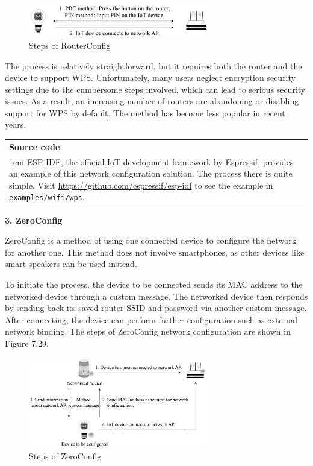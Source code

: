 \documentclass[a4paper,12pt,openany]{book}
\newcommand{\note}[2][NOTE]{ %
\vspace{6pt}
\begin{tabular}{b{\textwidth}}
\hline
\fontfamily{phv}\selectfont \textbf{#1}\\
\leftskip 1em #2\\
\hline
\end{tabular}
}
\begin{document}
\begin{figure}[!h]
    \centering
    \includegraphics[width=0.7\textwidth]{D7Z/7-28}
    \caption{Steps of RouterConfig}
\end{figure}

The process is relatively straightforward, but it requires both the router and the device to support WPS. Unfortunately, many users neglect encryption security settings due to the cumbersome steps involved, which can lead to serious security issues. As a result, an increasing number of routers are abandoning or disabling support for WPS by default. The method has become less popular in recent years.

\note[Source code]{ESP-IDF, the official IoT development framework by Espressif, provides an example of this network configuration solution. The process there is quite simple. Visit \url{https://github.com/espressif/esp-idf} to see the example in \href{https://github.com/espressif/esp-idf/tree/master/examples/wifi/wps}{\texttt{examples/wifi/wps}}.}

\textbf{3. ZeroConfig}

ZeroConfig is a method of using one connected device to configure the network for another one. This method does not involve smartphones, as other devices like smart speakers can be used instead.

To initiate the process, the device to be connected sends its MAC address to the networked device through a custom message. The networked device then responds by sending back its saved router SSID and password via another custom message. After connecting, the device can perform further configuration such as external network binding. The steps of ZeroConfig network configuration are shown in Figure 7.29.

\begin{figure}[!h]
    \centering
    \includegraphics[width=0.7\textwidth]{D7Z/7-29}
    \caption{Steps of ZeroConfig}
\end{figure}
\end{document}
